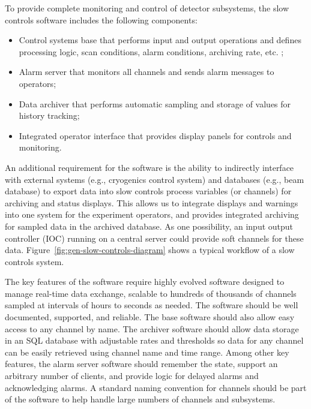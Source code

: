To provide complete monitoring and control of detector subsystems, the slow controls software includes the following components:
%
\begin{itemize}
 \item{Control systems base} that performs input and output operations
  and defines processing logic, scan conditions, alarm conditions,
  archiving rate, etc.  ;
 \item{Alarm server} that monitors all channels and sends alarm
  messages to operators; 
 \item{Data archiver} that performs automatic sampling and storage of
  values for history tracking;
 \item{Integrated operator interface} that provides display panels for
  controls and monitoring.
\end{itemize}

An additional requirement for the software is the ability to indirectly
interface with external systems (e.g., cryogenics control
system) and databases (e.g., beam database) to export data into
slow controls process variables (or channels) for archiving and status
displays. This allows us to integrate displays and warnings into one
system for the experiment operators, and %
provides integrated
archiving for sampled data in the archived database. As one possibility, an input output controller (IOC) running on a central 
server could provide soft channels for these data.
Figure~\ref{fig:gen-slow-controls-diagram} shows a typical workflow of a
slow controls system.

The key features of the software require highly evolved software designed to manage real-time data exchange, scalable
to hundreds of thousands of channels sampled at intervals of hours to seconds as needed. The software
should be well documented, supported, and reliable. The base
software should also allow easy access to any channel by name. The
archiver software should allow data storage in an SQL database with
adjustable rates and thresholds so data
for any channel can be easily retrieved using channel name and time range. Among other key
features, the alarm server software should remember the state, support an
arbitrary number of clients, and provide logic for delayed alarms and
acknowledging alarms. A standard naming
convention for channels should be part of the software to help handle large
numbers of channels and subsystems.

